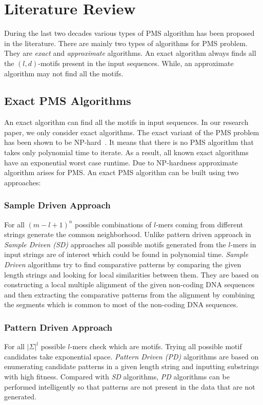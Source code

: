 \section{Literature Review}
During the last two decades various types of PMS algorithm has been proposed in the literature. There are mainly two types of algorithms for PMS problem. They are \textit{exact} and \textit{approximate} algorithms. An exact algorithm always finds all
the $ (l, d) $-motifs present in the input sequences. While, an approximate algorithm may not find all the motifs. 

\subsection{Exact PMS Algorithms}
An exact algorithm can find all the motifs in input sequences. In our research paper, we only consider exact algorithms. The exact variant of the PMS problem has been shown to be NP-hard~\cite{frances1997covering}. It means that there is no PMS algorithm that takes only polynomial time to iterate. As a result, all known exact algorithms have an exponential worst case runtime. Due to NP-hardness approximate algorithm arises for PMS. An exact PMS algorithm can be built using two approaches:

\subsubsection{Sample Driven Approach}
For all $ (m - l + 1)^{n} $ possible combinations of $ l $-mers coming from different strings generate the common neighborhood. Unlike pattern driven approach in \textit{Sample Driven (SD)} approaches all possible motifs generated from the $ l $-mers in input strings are of interest which could be found in polynomial time. \textit{Sample Driven} algorithms try to find comparative patterns by comparing the given length strings and looking for
local similarities between them. They are based on constructing a local multiple alignment of the given non-coding DNA sequences and then extracting the comparative patterns from the alignment by combining the segments which is common to most of the
non-coding DNA sequences.

\subsubsection{Pattern Driven Approach}
For all $ |\Sigma|^{l} $ possible $ l $-mers check which are motifs. Trying all possible motif candidates take exponential space. \textit{Pattern Driven (PD)} algorithms are based on enumerating candidate patterns in a given length string and inputting substrings with high fitness. Compared with \textit{SD} algorithms, \textit{PD} algorithms can be performed intelligently so that patterns are not present in the data that are not generated.


